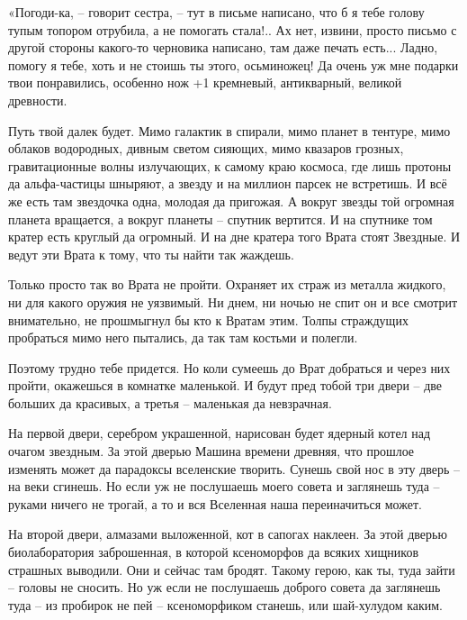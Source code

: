 \documentclass[ebook,oneside,final,openright]{memoir}
\begin{document}
\par
«Погоди-ка, – говорит сестра, – тут в письме написано, что б я тебе голову тупым топором отрубила, а не помогать стала!.. Ах нет, извини, просто письмо с другой стороны какого-то черновика написано, там даже печать есть... Ладно, помогу я тебе, хоть и не стоишь ты этого, осьминожец! Да очень уж мне подарки твои понравились, особенно нож +1 кремневый, антикварный, великой древности.\par
\par
Путь твой далек будет. Мимо галактик в спирали, мимо планет в тентуре, мимо облаков водородных, дивным светом сияющих, мимо квазаров грозных, гравитационные волны излучающих, к самому краю космоса, где лишь протоны да альфа-частицы шныряют, а звезду и на миллион парсек не встретишь. И всё же есть там звездочка одна, молодая да пригожая. А вокруг звезды той огромная планета вращается, а вокруг планеты – спутник вертится. И на спутнике том кратер есть круглый да огромный. И на дне кратера того Врата стоят Звездные. И ведут эти Врата к тому, что ты найти так жаждешь.\par
\par
Только просто так во Врата не пройти. Охраняет их страж из металла жидкого, ни для какого оружия не уязвимый. Ни днем, ни ночью не спит он и все смотрит внимательно, не прошмыгнул бы кто к Вратам этим. Толпы страждущих пробраться мимо него пытались, да так там костьми и полегли.\par
\par
Поэтому трудно тебе придется. Но коли сумеешь до Врат добраться и через них пройти, окажешься в комнатке маленькой. И будут пред тобой три двери – две больших да красивых, а третья – маленькая да невзрачная.\par
\par
На первой двери, серебром украшенной, нарисован будет ядерный котел над очагом звездным. За этой дверью Машина времени древняя, что прошлое изменять может да парадоксы вселенские творить. Сунешь свой нос в эту дверь – на веки сгинешь. Но если уж не послушаешь моего совета и заглянешь туда – руками ничего не трогай, а то и вся Вселенная наша переиначиться может.\par
\par
На второй двери, алмазами выложенной, кот в сапогах наклеен. За этой дверью биолаборатория заброшенная, в которой ксеноморфов да всяких хищников страшных выводили. Они и сейчас там бродят. Такому герою, как ты, туда зайти – головы не сносить. Но уж если не послушаешь доброго совета да заглянешь туда – из пробирок не пей – ксеноморфиком станешь, или шай-хулудом каким.\par
\end{document}
